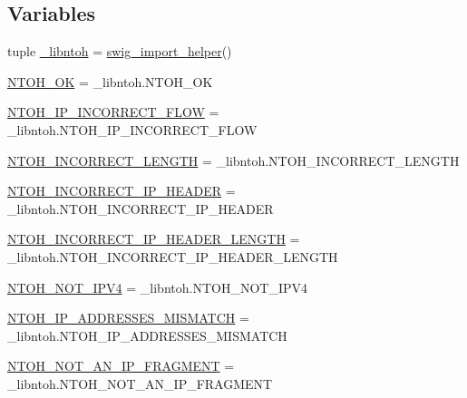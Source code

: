 \subsection*{Variables}
\begin{DoxyCompactItemize}
\item 
tuple \hyperlink{namespacelibntoh_ac7d41d0284cbda5058b8afb092a3c22b}{\-\_\-libntoh} = \hyperlink{namespacelibntoh_a20a40d2e70bce861f694525f66632730}{swig\-\_\-import\-\_\-helper}()
\item 
\hyperlink{namespacelibntoh_a7a0f0cbd03d16ada6867afe8bb81dc7a}{N\-T\-O\-H\-\_\-\-O\-K} = \-\_\-libntoh.\-N\-T\-O\-H\-\_\-\-O\-K
\item 
\hyperlink{namespacelibntoh_aa5ec8122285114e056b6bcde6763fbfa}{N\-T\-O\-H\-\_\-\-I\-P\-\_\-\-I\-N\-C\-O\-R\-R\-E\-C\-T\-\_\-\-F\-L\-O\-W} = \-\_\-libntoh.\-N\-T\-O\-H\-\_\-\-I\-P\-\_\-\-I\-N\-C\-O\-R\-R\-E\-C\-T\-\_\-\-F\-L\-O\-W
\item 
\hyperlink{namespacelibntoh_a59f6f21e45ca4e95b0081be37510d1b4}{N\-T\-O\-H\-\_\-\-I\-N\-C\-O\-R\-R\-E\-C\-T\-\_\-\-L\-E\-N\-G\-T\-H} = \-\_\-libntoh.\-N\-T\-O\-H\-\_\-\-I\-N\-C\-O\-R\-R\-E\-C\-T\-\_\-\-L\-E\-N\-G\-T\-H
\item 
\hyperlink{namespacelibntoh_a80d85f98d94f130f1e81f12c81a5282f}{N\-T\-O\-H\-\_\-\-I\-N\-C\-O\-R\-R\-E\-C\-T\-\_\-\-I\-P\-\_\-\-H\-E\-A\-D\-E\-R} = \-\_\-libntoh.\-N\-T\-O\-H\-\_\-\-I\-N\-C\-O\-R\-R\-E\-C\-T\-\_\-\-I\-P\-\_\-\-H\-E\-A\-D\-E\-R
\item 
\hyperlink{namespacelibntoh_a79c570111b87290199f0eef0141faf29}{N\-T\-O\-H\-\_\-\-I\-N\-C\-O\-R\-R\-E\-C\-T\-\_\-\-I\-P\-\_\-\-H\-E\-A\-D\-E\-R\-\_\-\-L\-E\-N\-G\-T\-H} = \-\_\-libntoh.\-N\-T\-O\-H\-\_\-\-I\-N\-C\-O\-R\-R\-E\-C\-T\-\_\-\-I\-P\-\_\-\-H\-E\-A\-D\-E\-R\-\_\-\-L\-E\-N\-G\-T\-H
\item 
\hyperlink{namespacelibntoh_af7e2f6c1f84b76d4cb674bbe137824ce}{N\-T\-O\-H\-\_\-\-N\-O\-T\-\_\-\-I\-P\-V4} = \-\_\-libntoh.\-N\-T\-O\-H\-\_\-\-N\-O\-T\-\_\-\-I\-P\-V4
\item 
\hyperlink{namespacelibntoh_af16970f6b7dde256e2102c89d72eefa1}{N\-T\-O\-H\-\_\-\-I\-P\-\_\-\-A\-D\-D\-R\-E\-S\-S\-E\-S\-\_\-\-M\-I\-S\-M\-A\-T\-C\-H} = \-\_\-libntoh.\-N\-T\-O\-H\-\_\-\-I\-P\-\_\-\-A\-D\-D\-R\-E\-S\-S\-E\-S\-\_\-\-M\-I\-S\-M\-A\-T\-C\-H
\item 
\hyperlink{namespacelibntoh_aa407d05437fc821404621b678d46666c}{N\-T\-O\-H\-\_\-\-N\-O\-T\-\_\-\-A\-N\-\_\-\-I\-P\-\_\-\-F\-R\-A\-G\-M\-E\-N\-T} = \-\_\-libntoh.\-N\-T\-O\-H\-\_\-\-N\-O\-T\-\_\-\-A\-N\-\_\-\-I\-P\-\_\-\-F\-R\-A\-G\-M\-E\-N\-T

\end{DoxyCompactItemize}
